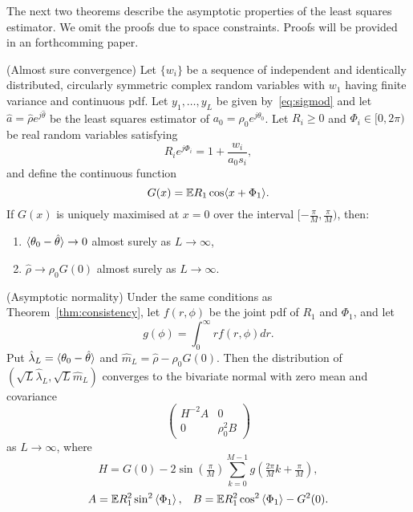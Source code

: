 \documentclass{article}
\begin{document}
The next two theorems describe the asymptotic properties of the least squares estimator.  We omit the proofs due to space constraints.  Proofs will be provided in an forthcomming paper.

\begin{theorem}\label{thm:consistency} (Almost sure convergence)
Let $\{w_i\}$ be a sequence of independent and identically distributed, circularly symmetric complex random variables with $w_1$ having finite variance and continuous pdf.  Let $y_1,\dots, y_L$ be given by~\eqref{eq:sigmod} and let $\hat{a} = \hat{\rho}e^{j\hat{\theta}}$ be the least squares estimator of $a_0 = \rho_0e^{j\theta_0}$.  Let $R_i \geq 0$ and $\Phi_i \in [0,2\pi)$ be real random variables satisfying
\[
R_ie^{j\Phi_i} = 1 + \frac{w_i}{a_0 s_i},
\]
and define the continuous function
\[
G(x) = {\mathbb E} R_1 \cos\langle  x + \Phi_1 \rangle.
\] 
If $G(x)$ is uniquely maximised at $x = 0$ over the interval $[-\tfrac{\pi}{M},\tfrac{\pi}{M})$, then:
\begin{enumerate}
\item $\langle \theta_0 - \hat{\theta} \rangle \rightarrow 0$ almost surely as $L \rightarrow \infty$,
\item $\hat{\rho} \rightarrow \rho_0 G(0)$ almost surely as $L \rightarrow \infty$.
\end{enumerate}
\end{theorem}

\begin{theorem}\label{thm:normality} (Asymptotic normality)
Under the same conditions as Theorem~\ref{thm:consistency}, let $f(r,\phi)$ be the joint pdf of $R_1$ and $\Phi_1$, and let
\[
g(\phi) = \int_{0}^{\infty} r f(r,\phi) dr.
\]
Put $\hat{\lambda}_L = \langle \theta_0 - \hat{\theta} \rangle$ and $\hat{m}_L = \hat{\rho} - \rho_0 G(0)$. %
Then the distribution of $(\sqrt{L}\hat{\lambda}_L, \sqrt{L}\hat{m}_L)$ converges to the bivariate normal with zero mean and covariance
\[
\left( \begin{array}{cc} 
H^{-2} A & 0 \\
0 & \rho_0^2 B
\end{array} \right)
\]
as $L \rightarrow \infty$, where
\[
H = G(0) -  2 \sin(\tfrac{\pi}{M}) \sum_{k = 0}^{M-1} g(\tfrac{2\pi}{M}k + \tfrac{\pi}{M}),
\]
\[
A = {\mathbb E} R_1^2\sin^2\left\langle \Phi_1 \right\rangle, \;\;\; B = {\mathbb E} R_1^2 \cos^2\left\langle \Phi_1 \right\rangle - G^2(0). 
\]
\end{theorem}
\end{document}
